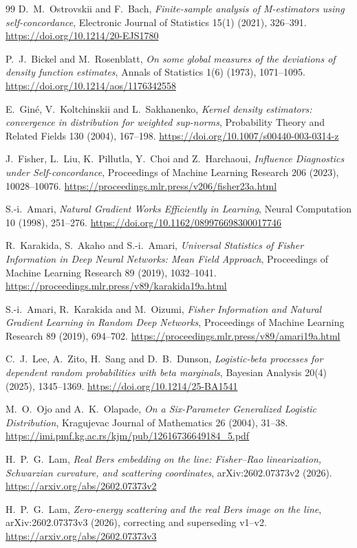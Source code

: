 \documentclass[11pt]{article}
\begin{document}
\begin{thebibliography}{99}
D.~M.~Ostrovskii and F.~Bach,
\emph{Finite-sample analysis of M-estimators using self-concordance},
Electronic Journal of Statistics 15(1) (2021), 326--391.
\url{https://doi.org/10.1214/20-EJS1780}

P.~J.~Bickel and M.~Rosenblatt,
\emph{On some global measures of the deviations of density function estimates},
Annals of Statistics 1(6) (1973), 1071--1095.
\url{https://doi.org/10.1214/aos/1176342558}

E.~Gin\'e, V.~Koltchinskii and L.~Sakhanenko,
\emph{Kernel density estimators: convergence in distribution for weighted sup-norms},
Probability Theory and Related Fields 130 (2004), 167--198.
\url{https://doi.org/10.1007/s00440-003-0314-z}

J.~Fisher, L.~Liu, K.~Pillutla, Y.~Choi and Z.~Harchaoui,
\emph{Influence Diagnostics under Self-concordance},
Proceedings of Machine Learning Research 206 (2023), 10028--10076.
\url{https://proceedings.mlr.press/v206/fisher23a.html}

S.-i.~Amari,
\emph{Natural Gradient Works Efficiently in Learning},
Neural Computation 10 (1998), 251--276.
\url{https://doi.org/10.1162/089976698300017746}

R.~Karakida, S.~Akaho and S.-i.~Amari,
\emph{Universal Statistics of Fisher Information in Deep Neural Networks: Mean Field Approach},
Proceedings of Machine Learning Research 89 (2019), 1032--1041.
\url{https://proceedings.mlr.press/v89/karakida19a.html}

S.-i.~Amari, R.~Karakida and M.~Oizumi,
\emph{Fisher Information and Natural Gradient Learning in Random Deep Networks},
Proceedings of Machine Learning Research 89 (2019), 694--702.
\url{https://proceedings.mlr.press/v89/amari19a.html}

C.~J.~Lee, A.~Zito, H.~Sang and D.~B.~Dunson,
\emph{Logistic-beta processes for dependent random probabilities with beta marginals},
Bayesian Analysis 20(4) (2025), 1345--1369.
\url{https://doi.org/10.1214/25-BA1541}

M.~O.~Ojo and A.~K.~Olapade,
\emph{On a Six-Parameter Generalized Logistic Distribution},
Kragujevac Journal of Mathematics 26 (2004), 31--38.
\url{https://imi.pmf.kg.ac.rs/kjm/pub/12616736649184_5.pdf}

H.~P.~G.~Lam,
\emph{Real Bers embedding on the line: Fisher--Rao linearization, Schwarzian curvature, and scattering coordinates},
arXiv:2602.07373v2 (2026).
\url{https://arxiv.org/abs/2602.07373v2}

H.~P.~G.~Lam,
\emph{Zero-energy scattering and the real Bers image on the line},
arXiv:2602.07373v3 (2026), correcting and superseding v1--v2.
\url{https://arxiv.org/abs/2602.07373v3}
\end{thebibliography}
\end{document}
